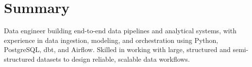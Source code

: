 
\section{Summary}

Data engineer building end-to-end data pipelines and analytical systems, with experience in data ingestion, modeling, and orchestration using Python, PostgreSQL, dbt, and Airflow.
Skilled in working with large, structured and semi-structured datasets to design reliable, scalable data workflows.
